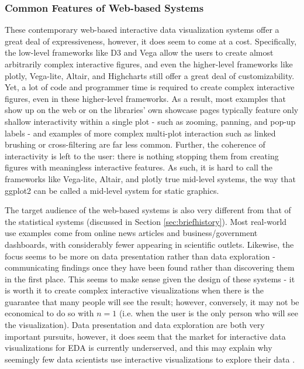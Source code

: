 \documentclass[12pt,a4paper]{article}
\begin{document}
\subsubsection{Common Features of Web-based Systems}

These contemporary web-based interactive data visualization systems offer a great deal of expressiveness, however, it does seem to come at a cost. Specifically, the low-level frameworks like D3 and Vega allow the users to create almost arbitrarily complex interactive figures, and even the higher-level frameworks like plotly, Vega-lite, Altair, and Highcharts still offer a great deal of customizability. Yet, a lot of code and programmer time is required to create complex interactive figures, even in these higher-level frameworks. As a result, most examples that show up on the web or on the libraries' own showcase pages typically feature only shallow interactivity within a single plot - such as zooming, panning, and pop-up labels - and examples of more complex multi-plot interaction such as linked brushing or cross-filtering are far less common. Further, the coherence of interactivity is left to the user: there is nothing stopping them from creating figures with meaningless interactive features. As such, it is hard to call the frameworks like Vega-lite, Altair, and plotly true mid-level systems, the way that ggplot2 can be called a mid-level system for static graphics.  

The target audience of the web-based systems is also very different from that of the statistical systems (discussed in Section \ref{sec:briefhistory}). Most real-world use examples come from online news articles and business/government dashboards, with considerably fewer appearing in scientific outlets. Likewise, the focus seems to be more on data presentation rather than data exploration - communicating findings once they have been found rather than discovering them in the first place. This seems to make sense given the design of these systems - it is worth it to create complex interactive visualizations when there is the guarantee that many people will see the result; however, conversely, it may not be economical to do so with $n = 1$ (i.e. when the user is the only person who will see the visualization). Data presentation and data exploration are both very important pursuits, however, it does seem that the market for interactive data visualizations for EDA is currently underserved, and this may explain why seemingly few data scientists use interactive visualizations to explore their data \citep{batch2017}.  
\end{document}
